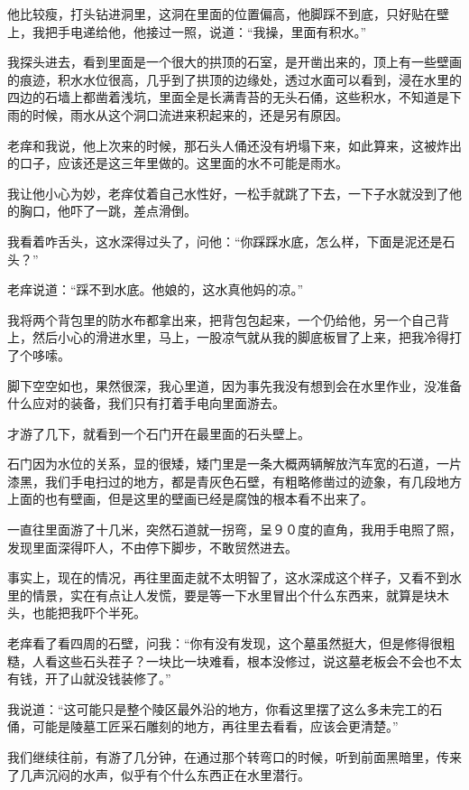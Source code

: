他比较瘦，打头钻进洞里，这洞在里面的位置偏高，他脚踩不到底，只好贴在壁上，我把手电递给他，他接过一照，说道：“我操，里面有积水。”

我探头进去，看到里面是一个很大的拱顶的石室，是开凿出来的，顶上有一些壁画的痕迹，积水水位很高，几乎到了拱顶的边缘处，透过水面可以看到，浸在水里的四边的石墙上都凿着浅坑，里面全是长满青苔的无头石俑，这些积水，不知道是下雨的时候，雨水从这个洞口流进来积起来的，还是另有原因。

老痒和我说，他上次来的时候，那石头人俑还没有坍塌下来，如此算来，这被炸出的口子，应该还是这三年里做的。这里面的水不可能是雨水。

我让他小心为妙，老痒仗着自己水性好，一松手就跳了下去，一下子水就没到了他的胸口，他吓了一跳，差点滑倒。

我看着咋舌头，这水深得过头了，问他：“你踩踩水底，怎么样，下面是泥还是石头？”

老痒说道：“踩不到水底。他娘的，这水真他妈的凉。”

我将两个背包里的防水布都拿出来，把背包包起来，一个仍给他，另一个自己背上，然后小心的滑进水里，马上，一股凉气就从我的脚底板冒了上来，把我冷得打了个哆嗦。

脚下空空如也，果然很深，我心里道，因为事先我没有想到会在水里作业，没准备什么应对的装备，我们只有打着手电向里面游去。

才游了几下，就看到一个石门开在最里面的石头壁上。

石门因为水位的关系，显的很矮，矮门里是一条大概两辆解放汽车宽的石道，一片漆黑，我们手电扫过的地方，都是青灰色石壁，有粗略修凿过的迹象，有几段地方上面的也有壁画，但是这里的壁画已经是腐蚀的根本看不出来了。

一直往里面游了十几米，突然石道就一拐弯，呈９０度的直角，我用手电照了照，发现里面深得吓人，不由停下脚步，不敢贸然进去。

事实上，现在的情况，再往里面走就不太明智了，这水深成这个样子，又看不到水里的情景，实在有点让人发慌，要是等一下水里冒出个什么东西来，就算是块木头，也能把我吓个半死。

老痒看了看四周的石壁，问我：“你有没有发现，这个墓虽然挺大，但是修得很粗糙，人看这些石头茬子？一块比一块难看，根本没修过，说这墓老板会不会也不太有钱，开了山就没钱装修了。”

我说道：“这可能只是整个陵区最外沿的地方，你看这里摆了这么多未完工的石俑，可能是陵墓工匠采石雕刻的地方，再往里去看看，应该会更清楚。”

我们继续往前，有游了几分钟，在通过那个转弯口的时候，听到前面黑暗里，传来了几声沉闷的水声，似乎有个什么东西正在水里潜行。

